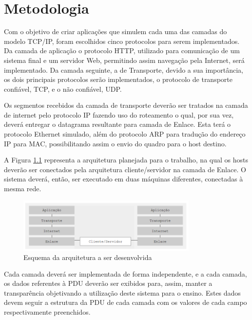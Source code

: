 
\chapter{Metodologia}
\label{chap:metodologia}
Com o objetivo de criar aplicações que simulem cada uma das camadas do modelo TCP/IP, foram escolhidos cinco protocolos para serem implementados. Da camada de aplicação o protocolo HTTP, utilizado para comunicação de um sistema final e um servidor Web, permitindo assim navegação pela Internet, será implementado. Da camada seguinte, a de Transporte, devido a sua importância, os dois principais protocolos serão implementados, o protocolo de transporte confiável, TCP, e o não confiável, UDP.
 
Os segmentos recebidos da camada de transporte deverão ser tratados na camada de internet pelo protocolo IP fazendo uso do roteamento o qual, por sua vez, deverá entregar o datagrama resultante para camada de Enlace. Esta terá o protocolo Ethernet simulado, além do protocolo ARP para tradução do endereço IP para MAC, possibilitando assim o envio do quadro para o host destino.

A Figura \ref{fig:objetivo} representa a arquitetura planejada para o trabalho, na qual os hosts deverão ser conectados pela arquitetura cliente/servidor na camada de Enlace. O sistema deverá, então, ser executado em duas máquinas diferentes, conectadas à mesma rede.


\begin{figure}[H]
	\centering
    \includegraphics[width=0.80\textwidth]{04-figuras/objetivo.png}
    \caption{Esquema da arquitetura a ser desenvolvida}
    \label{fig:objetivo}
\end{figure}

Cada camada deverá ser implementada de forma independente, e a cada camada, os dados referentes à PDU deverão ser exibidos para, assim, manter a transparência objetivando a utilização deste sistema para o ensino. Estes dados devem seguir a estrutura da PDU de cada camada com os valores de cada campo respectivamente preenchidos.

